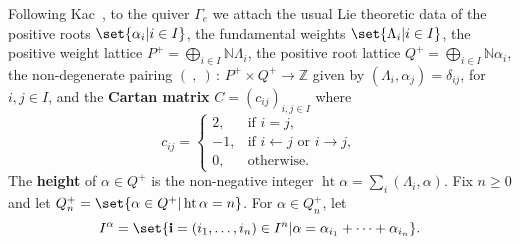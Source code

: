 \documentclass[leqno]{amsart}
\theoremstyle{plain}
\numberwithin{mainCorollary}{mainTheorem}
\numberwithin{equation}{section}
{\newaliascnt{{Assumption}}{equation}
\newtheorem{{Assumption}}[{Assumption}]{{Assumption}}
\aliascntresetthe{{Assumption}}
\expandafterautorefname\endcsname{{Assumption}}
}
{\newaliascnt{{Proposition}}{equation}
\newtheorem{{Proposition}}[{Proposition}]{{Proposition}}
\aliascntresetthe{{Proposition}}
\expandafterautorefname\endcsname{{Proposition}}
}
{\newaliascnt{{Theorem}}{equation}
\newtheorem{{Theorem}}[{Theorem}]{{Theorem}}
\aliascntresetthe{{Theorem}}
\expandafterautorefname\endcsname{{Theorem}}
}
{\newaliascnt{{Corollary}}{equation}
\newtheorem{{Corollary}}[{Corollary}]{{Corollary}}
\aliascntresetthe{{Corollary}}
\expandafterautorefname\endcsname{{Corollary}}
}
{\newaliascnt{{Conjecture}}{equation}
\newtheorem{{Conjecture}}[{Conjecture}]{{Conjecture}}
\aliascntresetthe{{Conjecture}}
\expandafterautorefname\endcsname{{Conjecture}}
}
{\newaliascnt{{Lemma}}{equation}
\newtheorem{{Lemma}}[{Lemma}]{{Lemma}}
\aliascntresetthe{{Lemma}}
\expandafterautorefname\endcsname{{Lemma}}
}
\theoremstyle{definition}
{\newaliascnt{{Definition}}{equation}
\newtheorem{{Definition}}[{Definition}]{{Definition}}
\aliascntresetthe{{Definition}}
\expandafterautorefname\endcsname{{Definition}}
}
\theoremstyle{remark}
{\newaliascnt{{Remark}}{equation}
\newtheorem{{Remark}}[{Remark}]{{Remark}}
\aliascntresetthe{{Remark}}
\expandafterautorefname\endcsname{{Remark}}
}
\begin{document}
{{Following Kac~\cite{Kac}, to the quiver $\Gamma_e$ we attach the usual
Lie theoretic data of the positive roots $\set{\alpha_i|i\in I}$, the
fundamental weights $\set{\Lambda_i|i\in I}$,
the positive weight lattice $P^+=\bigoplus_{i\in I}{\mathbb{N}}\Lambda_i$,
the positive root lattice $Q^+=\bigoplus_{i\in I}{\mathbb{N}}\alpha_i$,
the non-degenerate
pairing $(\  ,\ ){\,{:}\,{P^+\times Q^+}\!\longrightarrow\!{\mathbb{Z}}}$ given by
$(\Lambda_i,\alpha_j)=\delta_{ij}$, for $i,j\in I$, and the
\textbf{Cartan matrix} $C=(c_{ij})_{i,j\in I}$ where
\[
c_{ij}=\begin{cases}
  2,&\text{if }i=j,\\
  -1,&\text{if $i\leftarrow j$ or $i\rightarrow j$},\\
  0,&\text{otherwise.}
\end{cases}
\]
The \textbf{height} of $\alpha\in Q^+$ is the
non-negative integer $\operatorname{ht}\alpha=\sum_i(\Lambda_i,\alpha)$. Fix $n\ge0$ and let
$Q^+_n=\set{\alpha\in Q^+|\operatorname{ht}\alpha=n}$. For $\alpha\in Q^+_n$, let
\[
  I^\alpha=\set{{\mathbf{i}}=(i_1,\dots,i_n)\in I^n|\alpha=\alpha_{i_1}+\dots+\alpha_{i_n}}.
\]

}}
\end{document}
